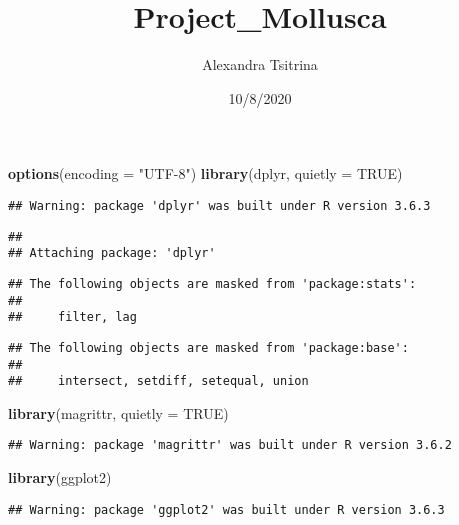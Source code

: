 \documentclass[
]{article}
\title{Project\_Mollusca}
\author{Alexandra Tsitrina}
\date{10/8/2020}
\newenvironment{Shaded}{\begin{snugshade}}{\end{snugshade}}
\newcommand{\DataTypeTok}[1]{\textcolor[rgb]{0.13,0.29,0.53}{#1}}
\newcommand{\KeywordTok}[1]{\textcolor[rgb]{0.13,0.29,0.53}{\textbf{#1}}}
\newcommand{\NormalTok}[1]{#1}
\newcommand{\OtherTok}[1]{\textcolor[rgb]{0.56,0.35,0.01}{#1}}
\newcommand{\StringTok}[1]{\textcolor[rgb]{0.31,0.60,0.02}{#1}}
\begin{document}
\maketitle

\begin{Shaded}
\begin{Highlighting}[]
\KeywordTok{options}\NormalTok{(}\DataTypeTok{encoding =} \StringTok{"UTF-8"}\NormalTok{)}
\KeywordTok{library}\NormalTok{(dplyr, }\DataTypeTok{quietly =} \OtherTok{TRUE}\NormalTok{)}
\end{Highlighting}
\end{Shaded}

\begin{verbatim}
## Warning: package 'dplyr' was built under R version 3.6.3
\end{verbatim}

\begin{verbatim}
## 
## Attaching package: 'dplyr'
\end{verbatim}

\begin{verbatim}
## The following objects are masked from 'package:stats':
## 
##     filter, lag
\end{verbatim}

\begin{verbatim}
## The following objects are masked from 'package:base':
## 
##     intersect, setdiff, setequal, union
\end{verbatim}

\begin{Shaded}
\begin{Highlighting}[]
\KeywordTok{library}\NormalTok{(magrittr, }\DataTypeTok{quietly =} \OtherTok{TRUE}\NormalTok{)}
\end{Highlighting}
\end{Shaded}

\begin{verbatim}
## Warning: package 'magrittr' was built under R version 3.6.2
\end{verbatim}

\begin{Shaded}
\begin{Highlighting}[]
\KeywordTok{library}\NormalTok{(ggplot2)}
\end{Highlighting}
\end{Shaded}

\begin{verbatim}
## Warning: package 'ggplot2' was built under R version 3.6.3
\end{verbatim}
\end{document}
